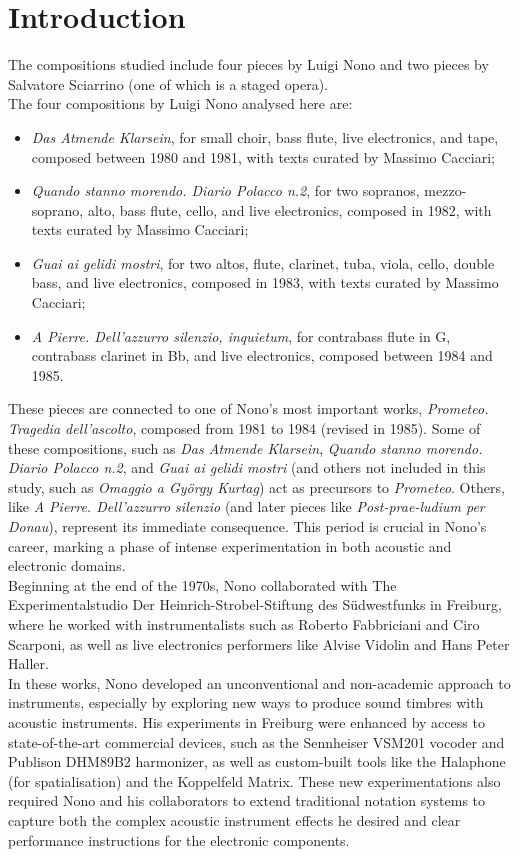\section{Introduction}
The compositions studied include four pieces by Luigi Nono and two pieces by Salvatore Sciarrino (one of which is a staged opera).\\
The four compositions by Luigi Nono analysed here are:
\begin{itemize}
\item \textit{Das Atmende Klarsein}, for small choir, bass flute, live electronics, and tape, composed between 1980 and 1981, with texts curated by Massimo Cacciari;
\item \textit{Quando stanno morendo. Diario Polacco n.2}, for two sopranos, mezzo-soprano, alto, bass flute, cello, and live electronics, composed in 1982, with texts curated by Massimo Cacciari;
\item \textit{Guai ai gelidi mostri}, for two altos, flute, clarinet, tuba, viola, cello, double bass, and live electronics, composed in 1983, with texts curated by Massimo Cacciari;
\item \textit{A Pierre. Dell’azzurro silenzio, inquietum}, for contrabass flute in G, contrabass clarinet in Bb, and live electronics, composed between 1984 and 1985.
\end{itemize}
These pieces are connected to one of Nono's most important works, \textit{Prometeo. Tragedia dell’ascolto}, composed from 1981 to 1984 (revised in 1985). Some of these compositions, such as \textit{Das Atmende Klarsein}, \textit{Quando stanno morendo. Diario Polacco n.2}, and \textit{Guai ai gelidi mostri} (and others not included in this study, such as \textit{Omaggio a György Kurtag}) act as precursors to \textit{Prometeo}. Others, like \textit{A Pierre. Dell’azzurro silenzio} (and later pieces like \textit{Post-prae-ludium per Donau}), represent its immediate consequence. This period is crucial in Nono’s career, marking a phase of intense experimentation in both acoustic and electronic domains.\\
Beginning at the end of the 1970s, Nono collaborated with The Experimentalstudio Der Heinrich-Strobel-Stiftung des Südwestfunks in Freiburg, where he worked with instrumentalists such as Roberto Fabbriciani and Ciro Scarponi, as well as live electronics performers like Alvise Vidolin and Hans Peter Haller.\\
In these works, Nono developed an unconventional and non-academic approach to instruments, especially by exploring new ways to produce sound timbres with acoustic instruments. His experiments in Freiburg were enhanced by access to state-of-the-art commercial devices, such as the Sennheiser VSM201 vocoder and Publison DHM89B2 harmonizer, as well as custom-built tools like the Halaphone (for spatialisation) and the Koppelfeld Matrix. These new experimentations also required Nono and his collaborators to extend traditional notation systems to capture both the complex acoustic instrument effects he desired and clear performance instructions for the electronic components.\\
